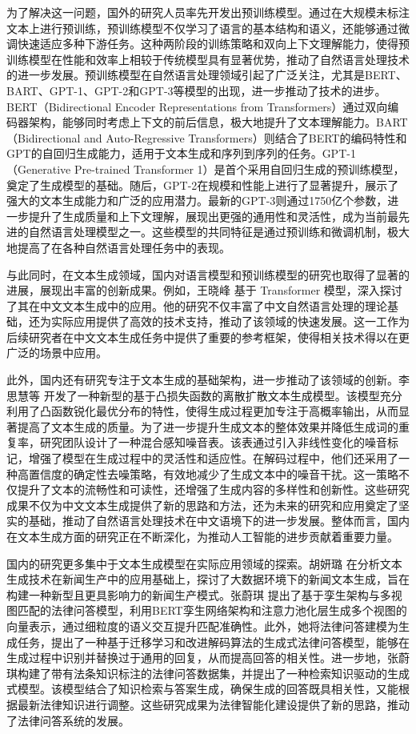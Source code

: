 为了解决这一问题，国外的研究人员率先开发出预训练模型。通过在大规模未标注文本上进行预训练，预训练模型不仅学习了语言的基本结构和语义，还能够通过微调快速适应多种下游任务。这种两阶段的训练策略和双向上下文理解能力，使得预训练模型在性能和效率上相较于传统模型具有显著优势，推动了自然语言处理技术的进一步发展。预训练模型在自然语言处理领域引起了广泛关注，尤其是BERT\cite{devlin_bert_2019}、BART\cite{lewis-etal-2020-bart}、GPT-1\cite{gpt}、GPT-2\cite{gpt2}和GPT-3\cite{gpt3}等模型的出现，进一步推动了技术的进步。BERT（Bidirectional Encoder Representations from Transformers）通过双向编码器架构，能够同时考虑上下文的前后信息，极大地提升了文本理解能力。BART（Bidirectional and Auto-Regressive Transformers）则结合了BERT的编码特性和GPT的自回归生成能力，适用于文本生成和序列到序列的任务。GPT-1（Generative Pre-trained Transformer 1）是首个采用自回归生成的预训练模型，奠定了生成模型的基础。随后，GPT-2在规模和性能上进行了显著提升，展示了强大的文本生成能力和广泛的应用潜力。最新的GPT-3则通过1750亿个参数，进一步提升了生成质量和上下文理解，展现出更强的通用性和灵活性，成为当前最先进的自然语言处理模型之一。这些模型的共同特征是通过预训练和微调机制，极大地提高了在各种自然语言处理任务中的表现。

与此同时，在文本生成领域，国内对语言模型和预训练模型的研究也取得了显著的进展，展现出丰富的创新成果。例如，王晓峰 \cite{transformer-cn} 基于 Transformer 模型，深入探讨了其在中文文本生成中的应用。他的研究不仅丰富了中文自然语言处理的理论基础，还为实际应用提供了高效的技术支持，推动了该领域的快速发展。这一工作为后续研究者在中文文本生成任务中提供了重要的参考框架，使得相关技术得以在更广泛的场景中应用。

此外，国内还有研究专注于文本生成的基础架构，进一步推动了该领域的创新。李思慧等 \cite{lisihui-textgenerate} 开发了一种新型的基于凸损失函数的离散扩散文本生成模型。该模型充分利用了凸函数锐化最优分布的特性，使得生成过程更加专注于高概率输出，从而显著提高了文本生成的质量。为了进一步提升生成文本的整体效果并降低生成词的重复率，研究团队设计了一种混合感知噪音表。该表通过引入非线性变化的噪音标记，增强了模型在生成过程中的灵活性和适应性。在解码过程中，他们还采用了一种高置信度的确定性去噪策略，有效地减少了生成文本中的噪音干扰。这一策略不仅提升了文本的流畅性和可读性，还增强了生成内容的多样性和创新性。这些研究成果不仅为中文文本生成提供了新的思路和方法，还为未来的研究和应用奠定了坚实的基础，推动了自然语言处理技术在中文语境下的进一步发展。整体而言，国内在文本生成方面的研究正在不断深化，为推动人工智能的进步贡献着重要力量。

国内的研究更多集中于文本生成模型在实际应用领域的探索。胡妍璐 \cite{huyanlu-textgenerate-news} 在分析文本生成技术在新闻生产中的应用基础上，探讨了大数据环境下的新闻文本生成，旨在构建一种新型且更具影响力的新闻生产模式。张蔚琪 \cite{zhangweiqi} 提出了基于孪生架构与多视图匹配的法律问答模型，利用BERT孪生网络架构和注意力池化层生成多个视图的向量表示，通过细粒度的语义交互提升匹配准确性。此外，她将法律问答建模为生成任务，提出了一种基于迁移学习和改进解码算法的生成式法律问答模型，能够在生成过程中识别并替换过于通用的回复，从而提高回答的相关性。进一步地，张蔚琪构建了带有法条知识标注的法律问答数据集，并提出了一种检索知识驱动的生成式模型。该模型结合了知识检索与答案生成，确保生成的回答既具相关性，又能根据最新法律知识进行调整。这些研究成果为法律智能化建设提供了新的思路，推动了法律问答系统的发展。

